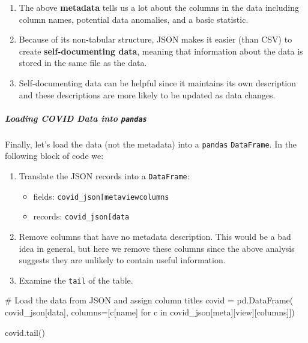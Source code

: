 \documentclass[
  letterpaper,
  DIV=11,
  numbers=noendperiod]{scrreprt}
\let\oldsubparagraph\subparagraph
\renewcommand{\subparagraph}[1]{\oldsubparagraph{#1}\mbox{}}
\newenvironment{Shaded}{\begin{snugshade}}{\end{snugshade}}
\newcommand{\CommentTok}[1]{\textcolor[rgb]{0.37,0.37,0.37}{#1}}
\newcommand{\ControlFlowTok}[1]{\textcolor[rgb]{0.00,0.23,0.31}{#1}}
\newcommand{\KeywordTok}[1]{\textcolor[rgb]{0.00,0.23,0.31}{#1}}
\newcommand{\NormalTok}[1]{\textcolor[rgb]{0.00,0.23,0.31}{#1}}
\newcommand{\OperatorTok}[1]{\textcolor[rgb]{0.37,0.37,0.37}{#1}}
\newcommand{\StringTok}[1]{\textcolor[rgb]{0.13,0.47,0.30}{#1}}
\providecommand{\tightlist}{%
  \setlength{\itemsep}{0pt}\setlength{\parskip}{0pt}}\usepackage{longtable,booktabs,array}
\begin{document}
\begin{enumerate}
\def\labelenumi{\arabic{enumi}.}
\tightlist
\item
  The above \textbf{metadata} tells us a lot about the columns in the
  data including column names, potential data anomalies, and a basic
  statistic.
\item
  Because of its non-tabular structure, JSON makes it easier (than CSV)
  to create \textbf{self-documenting data}, meaning that information
  about the data is stored in the same file as the data.
\item
  Self-documenting data can be helpful since it maintains its own
  description and these descriptions are more likely to be updated as
  data changes.
\end{enumerate}

\subparagraph{\texorpdfstring{Loading COVID Data into
\texttt{pandas}}{Loading COVID Data into pandas}}\label{loading-covid-data-into-pandas}

Finally, let's load the data (not the metadata) into a \texttt{pandas}
\texttt{DataFrame}. In the following block of code we:

\begin{enumerate}
\def\labelenumi{\arabic{enumi}.}
\item
  Translate the JSON records into a \texttt{DataFrame}:

  \begin{itemize}
  \tightlist
  \item
    fields:
    \texttt{covid\_json{[}\textquotesingle{}meta\textquotesingle{}{]}{[}\textquotesingle{}view\textquotesingle{}{]}{[}\textquotesingle{}columns\textquotesingle{}{]}}
  \item
    records:
    \texttt{covid\_json{[}\textquotesingle{}data\textquotesingle{}{]}}
  \end{itemize}
\item
  Remove columns that have no metadata description. This would be a bad
  idea in general, but here we remove these columns since the above
  analysis suggests they are unlikely to contain useful information.
\item
  Examine the \texttt{tail} of the table.
\end{enumerate}

\begin{Shaded}
\begin{Highlighting}[]
\CommentTok{\# Load the data from JSON and assign column titles}
\NormalTok{covid }\OperatorTok{=}\NormalTok{ pd.DataFrame(}
\NormalTok{    covid\_json[}\StringTok{\textquotesingle{}data\textquotesingle{}}\NormalTok{],}
\NormalTok{    columns}\OperatorTok{=}\NormalTok{[c[}\StringTok{\textquotesingle{}name\textquotesingle{}}\NormalTok{] }\ControlFlowTok{for}\NormalTok{ c }\KeywordTok{in}\NormalTok{ covid\_json[}\StringTok{\textquotesingle{}meta\textquotesingle{}}\NormalTok{][}\StringTok{\textquotesingle{}view\textquotesingle{}}\NormalTok{][}\StringTok{\textquotesingle{}columns\textquotesingle{}}\NormalTok{]])}

\NormalTok{covid.tail()}
\end{Highlighting}
\end{Shaded}
\end{document}
